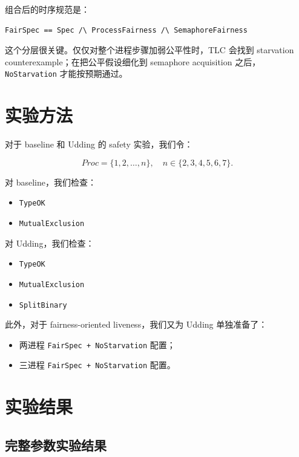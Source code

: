 \documentclass[11pt]{ctexart}
\begin{document}
组合后的时序规范是：

\begin{lstlisting}[language=TLA]
FairSpec == Spec /\ ProcessFairness /\ SemaphoreFairness
\end{lstlisting}

这个分层很关键。仅仅对整个进程步骤加弱公平性时，TLC 会找到 starvation counterexample；在把公平假设细化到 semaphore acquisition 之后，\texttt{NoStarvation} 才能按预期通过。

\section{实验方法}

对于 baseline 和 Udding 的 safety 实验，我们令：

\[
Proc = \{1,2,\dots,n\}, \quad n \in \{2,3,4,5,6,7\}.
\]

对 baseline，我们检查：

\begin{itemize}
  \item \texttt{TypeOK}
  \item \texttt{MutualExclusion}
\end{itemize}

对 Udding，我们检查：

\begin{itemize}
  \item \texttt{TypeOK}
  \item \texttt{MutualExclusion}
  \item \texttt{SplitBinary}
\end{itemize}

此外，对于 fairness-oriented liveness，我们又为 Udding 单独准备了：

\begin{itemize}
  \item 两进程 \texttt{FairSpec + NoStarvation} 配置；
  \item 三进程 \texttt{FairSpec + NoStarvation} 配置。
\end{itemize}

\section{实验结果}

\subsection{完整参数实验结果}
\end{document}
